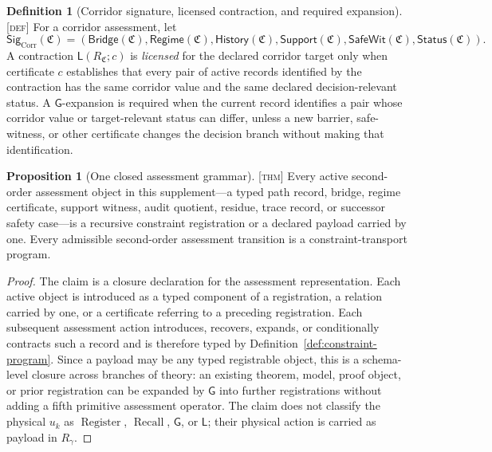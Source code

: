 \documentclass[11pt]{article}
\newcommand{\Register}{\ensuremath{\operatorname{Register}}}
\newcommand{\Recall}{\ensuremath{\operatorname{Recall}}}
\newcommand{\GOp}{\ensuremath{\mathsf{G}}}
\newcommand{\LOp}{\ensuremath{\mathsf{L}}}
\newcommand{\CorrSig}{\ensuremath{\mathsf{Sig}_{\mathrm{Corr}}}}
\newcommand{\Defn}{\textsc{[def]}}
\newcommand{\Thm}{\textsc{[thm]}}
\theoremstyle{definition}
\newtheorem{sdefinition}{Definition}
\newtheorem{sproposition}{Proposition}
\begin{document}
\begin{sdefinition}[Corridor signature, licensed contraction, and required expansion]
\label{def:licensed-contraction}
\Defn{} For a corridor assessment, let
\begin{equation}
\CorrSig(\mathfrak C)=
\left(
\mathsf{Bridge}(\mathfrak C),
\mathsf{Regime}(\mathfrak C),
\mathsf{History}(\mathfrak C),
\mathsf{Support}(\mathfrak C),
\mathsf{SafeWit}(\mathfrak C),
\mathsf{Status}(\mathfrak C)
\right).
\label{eq:corridor-signature}
\end{equation}
A contraction $\LOp(R_{\mathfrak C};c)$ is \emph{licensed} for the declared
corridor target only when certificate $c$ establishes that every pair of active
records identified by the contraction has the same corridor value and the same
declared decision-relevant status. A $\GOp$-expansion is required when the current
record identifies a pair whose corridor value or target-relevant status can differ,
unless a new barrier, safe-witness, or other certificate changes the decision
branch without making that identification.
\end{sdefinition}

\begin{sproposition}[One closed assessment grammar]
\label{prop:one-assessment-grammar}
\Thm{} Every active second-order assessment object in this supplement---a typed
path record, bridge, regime certificate, support witness, audit quotient, residue,
trace record, or successor safety case---is a recursive constraint registration or
a declared payload carried by one. Every admissible second-order assessment
transition is a constraint-transport program.
\end{sproposition}

\begin{proof}
The claim is a closure declaration for the assessment representation. Each active
object is introduced as a typed component of a registration, a relation carried by
one, or a certificate referring to a preceding registration. Each subsequent
assessment action introduces, recovers, expands, or conditionally contracts such a
record and is therefore typed by Definition~\ref{def:constraint-program}. Since a
payload may be any typed registrable object, this is a schema-level closure across
branches of theory: an existing theorem, model, proof object, or prior registration
can be expanded by $\GOp$ into further registrations without adding a fifth
primitive assessment operator. The claim does not classify the physical $u_k$ as
$\Register$, $\Recall$, $\GOp$, or $\LOp$; their physical action is carried as
payload in $R_{\gamma}$.
\end{proof}
\end{document}
